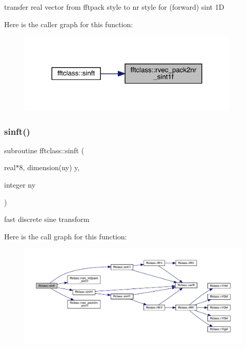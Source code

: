 transfer real vector from fftpack style to nr style for (forward) sint 1D 

Here is the caller graph for this function\+:\nopagebreak
\begin{figure}[H]
\begin{center}
\leavevmode
\includegraphics[width=299pt]{namespacefftclass_a667b3d13eccd40bf9e60f379f6d44e04_icgraph}
\end{center}
\end{figure}
\mbox{\label{namespacefftclass_abcd5ef700f07a29fa9949e15866f5d41}} 
\subsubsection{\texorpdfstring{sinft()}{sinft()}}
{\footnotesize\ttfamily subroutine fftclass\+::sinft (\begin{DoxyParamCaption}\item[{real$\ast$8, dimension(ny)}]{y,  }\item[{integer}]{ny }\end{DoxyParamCaption})}



fast discrete sine transform 

Here is the call graph for this function\+:\nopagebreak
\begin{figure}[H]
\begin{center}
\leavevmode
\includegraphics[width=350pt]{namespacefftclass_abcd5ef700f07a29fa9949e15866f5d41_cgraph}
\end{center}
\end{figure}
\mbox{\label{namespacefftclass_a6770a2a0c7bdf09af5ed719175fb4ca4}} 
